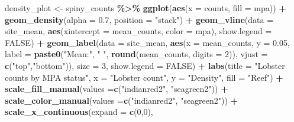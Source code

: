 \documentclass[
]{article}
\newenvironment{Shaded}{\begin{snugshade}}{\end{snugshade}}
\newcommand{\AttributeTok}[1]{\textcolor[rgb]{0.13,0.29,0.53}{#1}}
\newcommand{\ConstantTok}[1]{\textcolor[rgb]{0.56,0.35,0.01}{#1}}
\newcommand{\DecValTok}[1]{\textcolor[rgb]{0.00,0.00,0.81}{#1}}
\newcommand{\FloatTok}[1]{\textcolor[rgb]{0.00,0.00,0.81}{#1}}
\newcommand{\FunctionTok}[1]{\textcolor[rgb]{0.13,0.29,0.53}{\textbf{#1}}}
\newcommand{\NormalTok}[1]{#1}
\newcommand{\OtherTok}[1]{\textcolor[rgb]{0.56,0.35,0.01}{#1}}
\newcommand{\SpecialCharTok}[1]{\textcolor[rgb]{0.81,0.36,0.00}{\textbf{#1}}}
\newcommand{\StringTok}[1]{\textcolor[rgb]{0.31,0.60,0.02}{#1}}
\begin{document}
\begin{Shaded}
\begin{Highlighting}[]
\NormalTok{density\_plot }\OtherTok{\textless{}{-}}\NormalTok{ spiny\_counts }\SpecialCharTok{\%\textgreater{}\%}
  \FunctionTok{ggplot}\NormalTok{(}\FunctionTok{aes}\NormalTok{(}\AttributeTok{x =}\NormalTok{ counts, }\AttributeTok{fill =}\NormalTok{ mpa)) }\SpecialCharTok{+}
  \FunctionTok{geom\_density}\NormalTok{(}\AttributeTok{alpha =} \FloatTok{0.7}\NormalTok{,}
               \AttributeTok{position =} \StringTok{"stack"}\NormalTok{) }\SpecialCharTok{+}
  \FunctionTok{geom\_vline}\NormalTok{(}\AttributeTok{data =}\NormalTok{ site\_mean, }
             \FunctionTok{aes}\NormalTok{(}\AttributeTok{xintercept =}\NormalTok{ mean\_counts,}
                 \AttributeTok{color =}\NormalTok{ mpa),}
             \AttributeTok{show.legend =} \ConstantTok{FALSE}\NormalTok{) }\SpecialCharTok{+}
  \FunctionTok{geom\_label}\NormalTok{(}\AttributeTok{data =}\NormalTok{ site\_mean, }
             \FunctionTok{aes}\NormalTok{(}\AttributeTok{x =}\NormalTok{ mean\_counts, }
                 \AttributeTok{y =} \FloatTok{0.05}\NormalTok{,}
                 \AttributeTok{label =} \FunctionTok{paste0}\NormalTok{(}\StringTok{"Mean:"}\NormalTok{, }\StringTok{" "}\NormalTok{, }\FunctionTok{round}\NormalTok{(mean\_counts, }\AttributeTok{digits =} \DecValTok{2}\NormalTok{)),}
                 \AttributeTok{vjust =} \FunctionTok{c}\NormalTok{(}\StringTok{"top"}\NormalTok{,}\StringTok{"bottom"}\NormalTok{)),}
             \AttributeTok{size =} \DecValTok{3}\NormalTok{,}
             \AttributeTok{show.legend =} \ConstantTok{FALSE}\NormalTok{) }\SpecialCharTok{+}
  \FunctionTok{labs}\NormalTok{(}\AttributeTok{title =} \StringTok{"Lobster counts by MPA status"}\NormalTok{,}
       \AttributeTok{x =} \StringTok{"Lobster count"}\NormalTok{, }
       \AttributeTok{y =} \StringTok{"Density"}\NormalTok{,}
       \AttributeTok{fill =} \StringTok{"Reef"}\NormalTok{) }\SpecialCharTok{+}
  \FunctionTok{scale\_fill\_manual}\NormalTok{(}\AttributeTok{values =}\FunctionTok{c}\NormalTok{(}\StringTok{"indianred2"}\NormalTok{,}
                              \StringTok{"seagreen2"}\NormalTok{)) }\SpecialCharTok{+}
  \FunctionTok{scale\_color\_manual}\NormalTok{(}\AttributeTok{values =}\FunctionTok{c}\NormalTok{(}\StringTok{"indianred2"}\NormalTok{,}
                              \StringTok{"seagreen2"}\NormalTok{)) }\SpecialCharTok{+}
  \FunctionTok{scale\_x\_continuous}\NormalTok{(}\AttributeTok{expand =} \FunctionTok{c}\NormalTok{(}\DecValTok{0}\NormalTok{,}\DecValTok{0}\NormalTok{),}

\end{Highlighting}
\end{Shaded}
\end{document}
